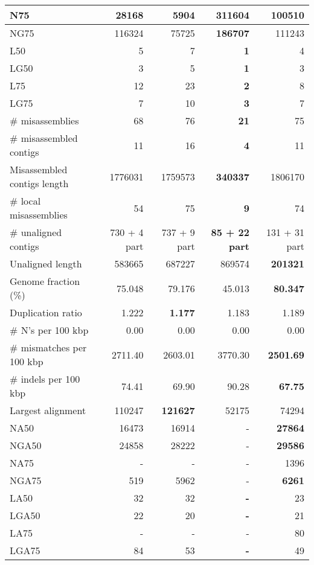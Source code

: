 \documentclass[12pt,a4paper]{article}
\begin{document}
\begin{table}[ht]
\begin{center}
\begin{tabular}{|l*{4}{|r}|}
N75 & 28168 & 5904 & {\bf 311604} & 100510 \\ \hline
NG75 & 116324 & 75725 & {\bf 186707} & 111243 \\ \hline
L50 & 5 & 7 & {\bf 1} & 4 \\ \hline
LG50 & 3 & 5 & {\bf 1} & 3 \\ \hline
L75 & 12 & 23 & {\bf 2} & 8 \\ \hline
LG75 & 7 & 10 & {\bf 3} & 7 \\ \hline
\# misassemblies & 68 & 76 & {\bf 21} & 75 \\ \hline
\# misassembled contigs & 11 & 16 & {\bf 4} & 11 \\ \hline
Misassembled contigs length & 1776031 & 1759573 & {\bf 340337} & 1806170 \\ \hline
\# local misassemblies & 54 & 75 & {\bf 9} & 74 \\ \hline
\# unaligned contigs & 730 + 4 part & 737 + 9 part & {\bf 85 + 22 part} & 131 + 31 part \\ \hline
Unaligned length & 583665 & 687227 & 869574 & {\bf 201321} \\ \hline
Genome fraction (\%) & 75.048 & 79.176 & 45.013 & {\bf 80.347} \\ \hline
Duplication ratio & 1.222 & {\bf 1.177} & 1.183 & 1.189 \\ \hline
\# N's per 100 kbp & 0.00 & 0.00 & 0.00 & 0.00 \\ \hline
\# mismatches per 100 kbp & 2711.40 & 2603.01 & 3770.30 & {\bf 2501.69} \\ \hline
\# indels per 100 kbp & 74.41 & 69.90 & 90.28 & {\bf 67.75} \\ \hline
Largest alignment & 110247 & {\bf 121627} & 52175 & 74294 \\ \hline
NA50 & 16473 & 16914 & - & {\bf 27864} \\ \hline
NGA50 & 24858 & 28222 & - & {\bf 29586} \\ \hline
NA75 & - & - & - & 1396 \\ \hline
NGA75 & 519 & 5962 & - & {\bf 6261} \\ \hline
LA50 & 32 & 32 & {\bf -} & 23 \\ \hline
LGA50 & 22 & 20 & {\bf -} & 21 \\ \hline
LA75 & - & - & - & 80 \\ \hline
LGA75 & 84 & 53 & {\bf -} & 49 \\ \hline
\end{tabular}
\end{center}
\end{table}
\end{document}
